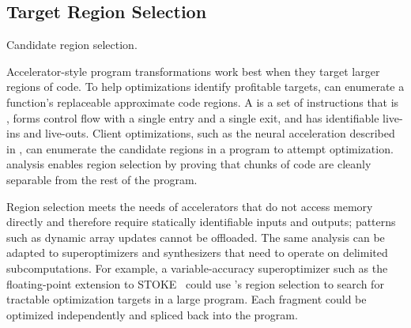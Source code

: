 \iffalse  %
Each program-relaxation strategy uses the shared \precisepurity analysis to
identify \emph{relaxation-opportunity sites:} places where the transformation
can apply. When \sysname finds an opportunity site, it registers the site along
with any relevant parameters in its catalog of such sites. The autotuner then
uses this catalog to enable a subset of relaxation opportunities and set their
parameters.  Section~\ref{accept:sec:autotuner} describes the autotuning process in more detail.
\fi

\subsection{Target Region Selection}
\label{accept:subsec:regions}

\begin{algorithm}[tb]
  \DontPrintSemicolon

   {
     {
    }
  }
\caption{Candidate region selection.}
\label{accept:alg:regionSel}
\end{algorithm}

Accelerator-style program transformations work best when they target larger
regions of code.
To help optimizations identify profitable targets,
\sysname can enumerate a
function's replaceable approximate code regions.
%
A  is a set of instructions that is \precisepure, forms
control flow with a single entry and a single exit, and has identifiable live-ins
and live-outs.
%
Client optimizations, such as the neural acceleration described in
, can enumerate the candidate regions in a program to attempt
optimization.  \Precisepurity analysis enables region selection by proving
that chunks of code are cleanly separable from the rest of the program.

Region selection meets the needs of accelerators that do not access memory
directly and therefore require statically identifiable inputs and outputs;
patterns such as dynamic array updates cannot be offloaded.  The same analysis
can be adapted to superoptimizers and synthesizers that need to operate on
delimited subcomputations.
%
For example, a variable-accuracy superoptimizer such as the floating-point
extension to STOKE~\cite{stoke-fp}
could use \sysname's region selection to search for
tractable optimization targets in a large program.
Each fragment could be optimized independently
and spliced back into the program.

